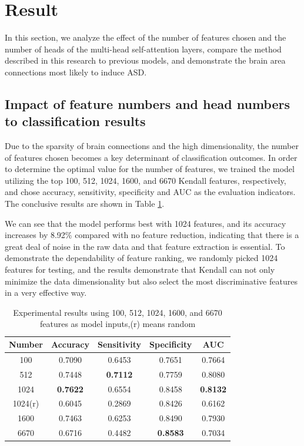 \documentclass[a4paper]{cas-dc}
\begin{document}
\section{Result}
In this section, we analyze the effect of the number of features chosen and the number of heads of the multi-head self-attention layers, compare the method described in this research to previous models, and demonstrate the brain area connections most likely to induce ASD.
\subsection{Impact of feature numbers and head numbers to classification results}
Due to the sparsity of brain connections and the high dimensionality, the number of features chosen becomes a key determinant of classification outcomes. In order to determine the optimal value for the number of features, we trained the model utilizing the top 100, 512, 1024, 1600, and 6670 Kendall features, respectively, and chose accuracy, sensitivity, specificity and AUC as the evaluation indicators. The conclusive results are shown in Table \ref{Table2}. 

We can see that the model performs best with 1024 features, and its accuracy increases by 8.92\% compared with no feature reduction, indicating that there is a great deal of noise in the raw data and that feature extraction is essential. To demonstrate the dependability of feature ranking, we randomly picked 1024 features for testing, and the results demonstrate that Kendall can not only minimize the data dimensionality but also select the most discriminative features in a very effective way.
\begin{table}[]
	\caption{Experimental results using 100, 512, 1024, 1600, and 6670 features as model inputs,(r) means random}\label{Table2}
	\begin{tabular*}{\tblwidth}{@{}ccccc@{}}
		\toprule
		\textbf{Number}& \textbf{Accuracy} & \textbf{Sensitivity} & \textbf{Specificity} & \textbf{AUC} \\ %
		\midrule
		100                                     & 0.7090              & 0.6453                & 0.7651                 & 0.7664           \\
		512                                     & 0.7448              & \textbf{0.7112}       & 0.7759                 & 0.8080           \\
		1024                                    & \textbf{0.7622}     & 0.6554                & 0.8458                 & \textbf{0.8132}  \\
		1024(r)                                 & 0.6045              & 0.2869                & 0.8426                 & 0.6162           \\
		1600                                    & 0.7463              & 0.6253                & 0.8490                 & 0.7930           \\
		6670                                    & 0.6716              & 0.4482                & \textbf{0.8583}        & 0.7034 \\
		\bottomrule
	\end{tabular*}
\end{table}
\end{document}
